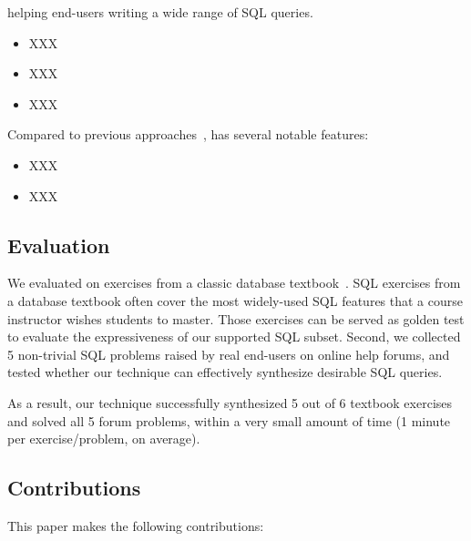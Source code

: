 helping end-users writing a wide range of SQL queries.

\begin{itemize}
\item XXX
\item XXX
\item XXX
\end{itemize}

Compared to previous approaches~\cite{}, \ourtool has several
notable features:

\begin{itemize}
\item XXX
\item XXX
\end{itemize}





\subsection{Evaluation}

We evaluated \ourtool on \exnum 
exercises from a classic database textbook~\cite{cowbook}. 
SQL exercises
from a database textbook often cover
the most widely-used SQL features 
that a course instructor wishes students to master.
Those exercises can be served as golden test
to evaluate the expressiveness of our supported SQL subset. 
Second,
we collected 5 non-trivial SQL problems raised by real end-users on online
help forums, and tested whether our technique can effectively synthesize desirable
SQL queries.  

As a result, our technique successfully synthesized 5 out of 6
textbook exercises and solved all 5 forum problems, within a very
small amount of time (1 minute per exercise/problem, on average).

\subsection{Contributions}

This paper makes the following contributions:

